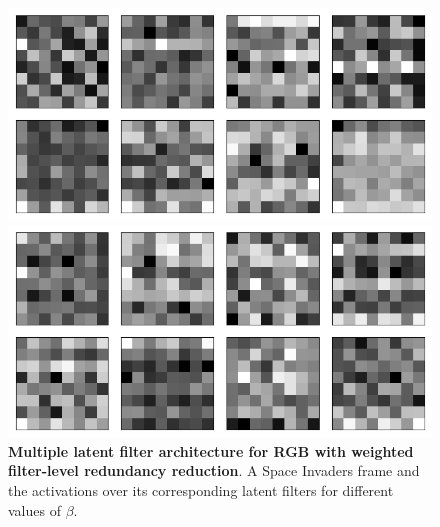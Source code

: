 \begin{figure}[h!]
\begin{minipage}{0.55\textwidth}
\caption{$\beta = 1$}
\includegraphics[scale=0.42]{figures/results/colour_separated/beta_2_convolutional_layers_sample_3.png}
\caption{$\beta = 2$}
\includegraphics[scale=0.42]{figures/results/colour_separated/beta_4_convolutional_layers_sample_3.png}
\caption{$\beta = 4$}
\end{minipage}
\caption{\textbf{Multiple latent filter architecture for RGB with weighted filter-level redundancy reduction}. A Space Invaders frame and the activations over its corresponding latent filters for different values of $\beta$.}
\label{fig:colour_separated_originals_and_latent_filters}
\end{figure}






